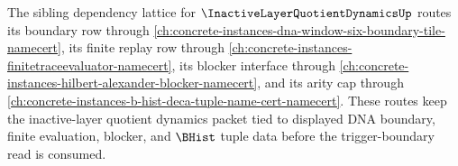 The sibling dependency lattice for $\InactiveLayerQuotientDynamicsUp$ routes its boundary row through \autoref{ch:concrete-instances-dna-window-six-boundary-tile-namecert}, its finite replay row through \autoref{ch:concrete-instances-finitetraceevaluator-namecert}, its blocker interface through \autoref{ch:concrete-instances-hilbert-alexander-blocker-namecert}, and its arity cap through \autoref{ch:concrete-instances-b-hist-deca-tuple-name-cert-namecert}. These routes keep the inactive-layer quotient dynamics packet tied to displayed DNA boundary, finite evaluation, blocker, and $\BHist$ tuple data before the trigger-boundary read is consumed.
